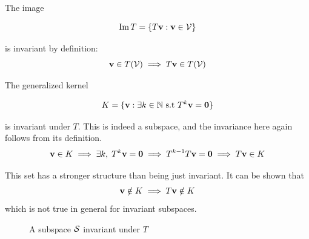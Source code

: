 \begin{example}\label{ex:invariance_image}
    The image

    \begin{equation*}
        \operatorname{Im} T=\{T\mathbf{v}: \mathbf{v}\in\mathcal{V}\}
    \end{equation*}

    is invariant by definition:
    \begin{equation*}
        \mathbf{v}\in T(\mathcal{V})\implies T\mathbf{v}\in T(\mathcal{V})
    \end{equation*}
\end{example}

\begin{example}\label{ex:invariance_ext_kernel}
    The generalized kernel

    \begin{equation*}
        K=\{\mathbf{v}: \exists k\in \mathbb{N} \text{ s.t } T^k\mathbf{v}=\mathbf{0}\}
    \end{equation*}

    is invariant under \( T \).
    This is indeed a subspace, and the invariance here again follows from its definition.
    \begin{equation*}
        \mathbf{v}\in K \implies \exists k,\; T^k\mathbf{v}=\mathbf{0} \implies T^{k-1}T\mathbf{v}=\mathbf{0} \implies T\mathbf{v}\in K
    \end{equation*}

    This set has a stronger structure than being just invariant. It can be shown that
    \begin{equation*}
        \mathbf{v}\notin K\implies T\mathbf{v}\notin K
    \end{equation*}
    which is not true in general for invariant subspaces.
\end{example}


\begin{figure}
    \centering
    \caption{A subspace \( \mathcal{S} \) invariant  under \(T\)}
\end{figure}

